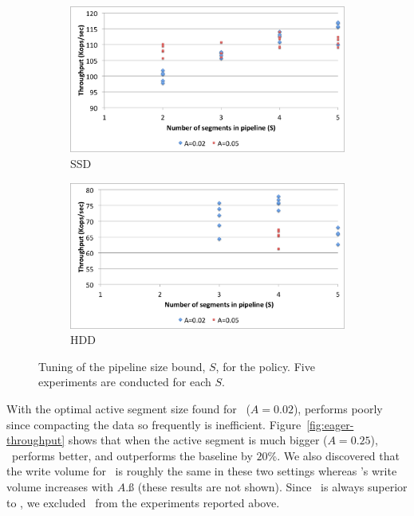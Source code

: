 \begin{figure}[tb]

  \centering
  
  \begin{subfigure}[t]{\columnwidth}
      \includegraphics[width=\figw]{Figs/pipeline-1-ssd.png}
      \caption[]{SSD}
    \label{fig:pipeline:ssd}  
  \end{subfigure}   
  \begin{subfigure}[t]{\columnwidth}
      \includegraphics[width=\figw]{Figs/pipeline-1-hdd.png}
      \caption[]{HDD}
    \label{fig:pipeline:hdd}
  \end{subfigure}

\caption{Tuning of the pipeline size bound, $S$, for the \basic\/ policy. Five experiments are conducted for each $S$.} 
\label{fig:pipeline}
\end{figure}

With the optimal active segment size found for \basic\ ($A=0.02$), \eager\/ performs poorly since compacting the data so frequently is inefficient. 
Figure~\ref{fig:eager-throughput} shows that when the active segment is much bigger ($A=0.25$), \eager\ performs better, and outperforms the 
baseline by $20$\%. We also discovered that the write volume for \eager\ is roughly the same in these two settings whereas \basic's write volume 
increases with $A$.ß (these results are not shown).  
Since \adp\ is always superior to \eager, we excluded \eager\ from the experiments reported above.  

